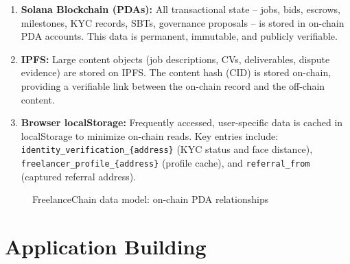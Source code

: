 \begin{enumerate}
    \item \textbf{Solana Blockchain (PDAs):} All transactional state -- jobs, bids, escrows, milestones, KYC records, SBTs, governance proposals -- is stored in on-chain PDA accounts. This data is permanent, immutable, and publicly verifiable.
    \item \textbf{IPFS:} Large content objects (job descriptions, CVs, deliverables, dispute evidence) are stored on IPFS. The content hash (CID) is stored on-chain, providing a verifiable link between the on-chain record and the off-chain content.
    \item \textbf{Browser localStorage:} Frequently accessed, user-specific data is cached in localStorage to minimize on-chain reads. Key entries include: \texttt{identity\_verification\_\{address\}} (KYC status and face distance), \texttt{freelancer\_profile\_\{address\}} (profile cache), and \texttt{referral\_from} (captured referral address).
\end{enumerate}

\begin{figure}[H]
    \centering
    \caption{FreelanceChain data model: on-chain PDA relationships}
    \label{fig:data_model}
\end{figure}

\section{Application Building}
\label{section:4.3}

